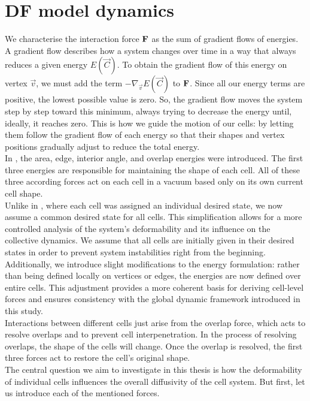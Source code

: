 \section{DF model dynamics} 
We characterise the interaction force $\mathbf{F}$ as the sum of gradient flows of energies. \\
A gradient flow describes how a system changes over time in a way that always reduces a given energy $E(\vec{C})$.
To obtain the gradient flow of this energy on vertex $\vec{v}$, we must add the term $-\nabla_{\vec{v}} E(\vec{C})$ to $\mathbf{F}$.
Since all our energy terms are positive, the lowest possible value is zero.  
So, the gradient flow moves the system step by step toward this minimum, always trying to decrease the energy until, ideally, it reaches zero. 
This is how we guide the motion of our cells: by letting them follow the gradient flow of each energy so that their shapes and vertex positions gradually adjust to reduce the total energy. \\
In \cite{Vogel2023}, the area, edge, interior angle, and overlap energies were introduced.
The first three energies are responsible for maintaining the shape of each cell. 
All of these three according forces act on each cell in a vacuum based only on its own current cell shape. \\
Unlike in \cite{Vogel2023}, where each cell was assigned an individual desired state, we now assume a common desired state for all cells. This simplification allows for a more controlled analysis of the system's deformability and its influence on the collective dynamics.
We assume that all cells are initially given in their desired states in order to prevent system instabilities right from the beginning. \\
Additionally, we introduce slight modifications to the energy formulation: rather than being defined locally on vertices or edges, the energies are now defined over entire cells. 
This adjustment provides a more coherent basis for deriving cell-level forces and ensures consistency with the global dynamic framework introduced in this study. \\
Interactions between different cells just arise from the overlap force, which acts to resolve overlaps and to prevent cell interpenetration. 
In the process of resolving overlaps, the shape of the cells will change.  
Once the overlap is resolved, the first three forces act to restore the cell's original shape. \\
The central question we aim to investigate in this thesis is how the deformability of individual cells influences the overall diffusivity of the cell system.
But first, let us introduce each of the mentioned forces. 

